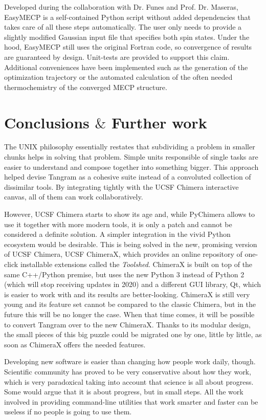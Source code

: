Developed during the collaboration with Dr. Funes and Prof. Dr. Maseras, EasyMECP is a self-contained Python script without added dependencies that takes care of all these steps automatically. The user only needs to provide a slightly modified Gaussian input file that specifies both spin states. Under the hood, EasyMECP still uses the original Fortran code, so convergence of results are guaranteed by design. Unit-tests are provided to support this claim. Additional conveniences have been implemented such as the generation of the optimization trajectory or the automated calculation of the often needed thermochemistry of the converged MECP structure.

\section{Conclusions $\&$  Further work}
The UNIX philosophy essentially restates that subdividing a problem in smaller chunks helps in solving that problem. Simple units responsible of single tasks are easier to understand and compose together into something bigger. This approach helped devise Tangram as a cohesive suite instead of a convoluted collection of dissimilar tools. By integrating tightly with the UCSF Chimera interactive canvas, all of them can work collaboratively.

However, UCSF Chimera starts to show its age and, while PyChimera allows to use it together with more modern tools, it is only a patch and cannot be considered a definite solution. A simpler integration in the vivid Python ecosystem would be desirable. This is being solved in the new, promising version of UCSF Chimera, UCSF ChimeraX,\cite{chimerax} which provides an online repository of one-click installable extensions called the \textit{Toolshed}. ChimeraX is built on top of the same C++/Python premise, but uses the new Python 3 instead of Python 2 (which will stop receiving updates in 2020) and a different GUI library, Qt, which is easier to work with and its results are better-looking. ChimeraX is still very young and its feature set cannot be compared to the classic Chimera, but in the future this will be no longer the case. When that time comes, it will be possible to convert Tangram over to the new ChimeraX. Thanks to its modular design, the small pieces of this big puzzle could be migrated one by one, little by little, as soon as ChimeraX offers the needed features.

Developing new software is easier than changing how people work daily, though. Scientific community has proved to be very conservative about how they work, which is very paradoxical taking into account that science is all about progress. Some would argue that it is about progress, but in small steps. All the work involved in providing command-line utilities that work smarter and faster can be useless if no people is going to use them.

